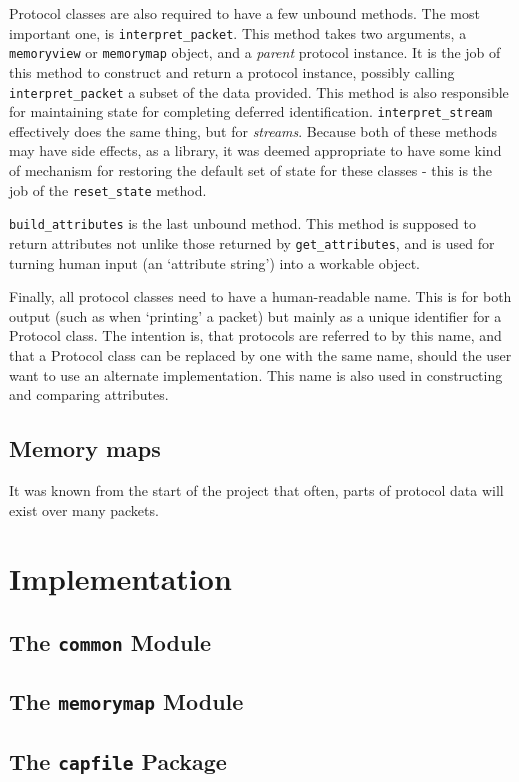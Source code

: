 \documentclass[10pt,a4paper,notitlepage]{report}
\begin{document}
Protocol classes are also required to have a few unbound methods. The most important one, is \texttt{interpret_packet}. 
This method takes two arguments, a \texttt{memoryview} or \texttt{memorymap} object, and a \emph{parent} protocol instance. It is the job of this method to construct and return a protocol instance, possibly calling \texttt{interpret_packet} a subset of the data provided. This method is also responsible for maintaining state for completing deferred identification. \texttt{interpret_stream} effectively does the same thing, but for \emph{streams}.
Because both of these methods may have side effects, as a library, it was deemed appropriate to have some kind of mechanism for restoring the default set of state for these classes - this is the job of the \texttt{reset_state} method.

\texttt{build_attributes} is the last unbound method. This method is supposed to return attributes not unlike those returned by \texttt{get_attributes}, and is used for turning human input (an `attribute string') into a workable object.

Finally, all protocol classes need to have a human-readable name. This is for both output (such as when `printing' a packet) but mainly as a unique identifier for a Protocol class. The intention is, that protocols are referred to by this name, and that a Protocol class can be replaced by one with the same name, should the user want to use an alternate implementation. This name is also used in constructing and comparing attributes.

\section{Memory maps}
\label{sec:memmap}
It was known from the start of the project that often, parts of protocol data will exist over many packets.


\chapter{Implementation}
\section{The \texttt{common} Module}
\section{The \texttt{memorymap} Module}
\section{The \texttt{capfile} Package}
\end{document}
